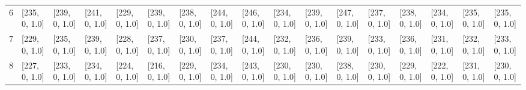 \begin{tabular}{lllllllllllllllll}
6    &  [235, 0, 1.0] &  [239, 0, 1.0] &    [241, 0, 1.0] &  [229, 0, 1.0] &  [239, 0, 1.0] &  [238, 0, 1.0] &  [244, 0, 1.0] &   [246, 0, 1.0] &    [234, 0, 1.0] &  [239, 0, 1.0] &   [247, 0, 1.0] &    [237, 0, 1.0] &  [238, 0, 1.0] &    [234, 0, 1.0] &  [235, 0, 1.0] &  [235, 0, 1.0] \\
7    &  [229, 0, 1.0] &  [235, 0, 1.0] &    [239, 0, 1.0] &  [228, 0, 1.0] &  [237, 0, 1.0] &  [230, 0, 1.0] &  [237, 0, 1.0] &   [244, 0, 1.0] &    [232, 0, 1.0] &  [236, 0, 1.0] &   [239, 0, 1.0] &    [233, 0, 1.0] &  [236, 0, 1.0] &    [231, 0, 1.0] &  [232, 0, 1.0] &  [233, 0, 1.0] \\
8    &  [227, 0, 1.0] &  [233, 0, 1.0] &    [234, 0, 1.0] &  [224, 0, 1.0] &  [216, 0, 1.0] &  [229, 0, 1.0] &  [234, 0, 1.0] &   [243, 0, 1.0] &    [230, 0, 1.0] &  [230, 0, 1.0] &   [238, 0, 1.0] &    [230, 0, 1.0] &  [229, 0, 1.0] &    [222, 0, 1.0] &  [231, 0, 1.0] &  [230, 0, 1.0] \\
\bottomrule
\end{tabular}
